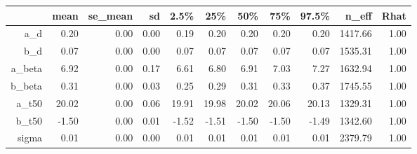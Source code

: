 \documentclass[12pt]{article}
\begin{document}
\begin{table}[ht]
\centering
\begin{tabular}{rrrrrrrrrrr}
  \hline
 & mean & se\_mean & sd & 2.5\% & 25\% & 50\% & 75\% & 97.5\% & n\_eff & Rhat \\ 
  \hline
a\_d & 0.20 & 0.00 & 0.00 & 0.19 & 0.20 & 0.20 & 0.20 & 0.20 & 1417.66 & 1.00 \\ 
  b\_d & 0.07 & 0.00 & 0.00 & 0.07 & 0.07 & 0.07 & 0.07 & 0.07 & 1535.31 & 1.00 \\ 
  a\_beta & 6.92 & 0.00 & 0.17 & 6.61 & 6.80 & 6.91 & 7.03 & 7.27 & 1632.94 & 1.00 \\ 
  b\_beta & 0.31 & 0.00 & 0.03 & 0.25 & 0.29 & 0.31 & 0.33 & 0.37 & 1745.55 & 1.00 \\ 
  a\_t50 & 20.02 & 0.00 & 0.06 & 19.91 & 19.98 & 20.02 & 20.06 & 20.13 & 1329.31 & 1.00 \\ 
  b\_t50 & -1.50 & 0.00 & 0.01 & -1.52 & -1.51 & -1.50 & -1.50 & -1.49 & 1342.60 & 1.00 \\ 
  sigma & 0.01 & 0.00 & 0.00 & 0.01 & 0.01 & 0.01 & 0.01 & 0.01 & 2379.79 & 1.00 \\ 
   \hline
\end{tabular}
\end{table}
\end{document}
